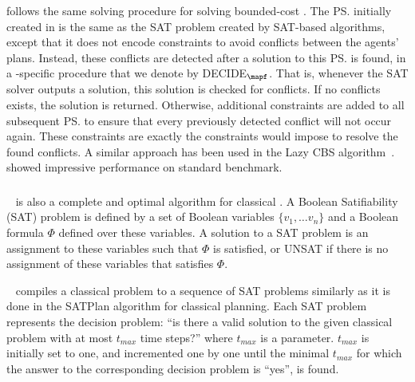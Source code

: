 \smtcbsO follows the same \smt solving procedure for solving bounded-cost \mapf. The \ps initially created in \smtcbsO is the same as the SAT problem created by SAT-based \mapf algorithms, except that it does not encode constraints to avoid conflicts between the agents' plans. 
Instead, these conflicts are detected after a solution to this \ps is found, in a \mapf-specific \decidet procedure that we denote by DECIDE$_\mapf$. 
That is, whenever the SAT solver outputs a solution, this solution is checked for conflicts. If no conflicts exists, the solution is returned. Otherwise, additional constraints are added to all subsequent \ps to ensure that every previously detected conflict will not occur again. These constraints are exactly the constraints \cbs would impose to resolve the found conflicts. 
A similar approach has been used in the Lazy CBS algorithm~\cite{gange2019lazy}. 
\smtcbsO showed impressive performance on standard \mapf benchmark. 







\subsubsection{\mddsat}
\label{sec:mdd-sat}
\mddsat~\cite{DBLP:conf/ecai/SurynekFSB16} is also a complete and optimal algorithm for classical \mapf. 
A Boolean Satifiability (SAT) problem is defined by a set of Boolean variables $\{v_1,\ldots v_n\}$ and a Boolean formula $\Phi$ defined over these variables. 
A solution to a SAT problem is an assignment to these variables such that $\Phi$ is satisfied, or UNSAT if there is no assignment of these variables that satisfies $\Phi$. 


\mddsat~\cite{DBLP:conf/ecai/SurynekFSB16} compiles a classical \mapf problem to a sequence of SAT problems similarly as it is done in the SATPlan \cite{DBLP:conf/ecai/KautzS92,DBLP:conf/ijcai/KautzS99} algorithm for classical planning. Each SAT problem represents the decision problem: ``is there a valid solution to the given classical \mapf problem with at most $t_{max}$ time steps?'' where $t_{max}$ is a parameter. 
$t_{max}$ is initially set to one, and incremented one by one until the minimal $t_{max}$ for which the answer to the corresponding decision problem is ``yes'', is found.  



